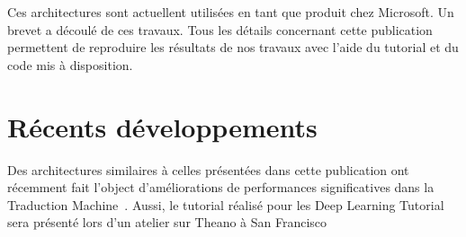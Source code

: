 Ces architectures sont actuellent utilisées en tant que produit chez Microsoft.
Un brevet a découlé de ces travaux. Tous les détails concernant cette
publication permettent de reproduire les résultats de nos travaux avec l'aide
du tutorial et du code mis à disposition. 

\section{R\'{e}cents d\'{e}veloppements}

Des architectures similaires à celles présentées dans cette publication ont
récemment fait l'object d'améliorations de performances significatives dans la
Traduction Machine~\citep{Seq-14}. Aussi, le tutorial réalisé pour les Deep
Learning Tutorial sera présenté lors d'un atelier sur Theano à San Francisco



